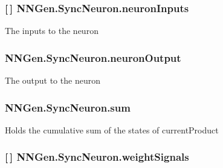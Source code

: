 \subsubsection[{neuron\+Inputs}]{ \mbox{[}$\,$\mbox{]} N\+N\+Gen.\+Sync\+Neuron.\+neuron\+Inputs\hspace{0.3cm}{\ttfamily [get]}}\label{class_n_n_gen_1_1_sync_neuron_a717f010aa22ec2a35ec0f314549a3177}


The inputs to the neuron 

\hypertarget{class_n_n_gen_1_1_sync_neuron_a0124d151cc6e1ff3dfbfe917e4d0ab2f}{}
\subsubsection[{neuron\+Output}]{ N\+N\+Gen.\+Sync\+Neuron.\+neuron\+Output\hspace{0.3cm}{\ttfamily [get]}}\label{class_n_n_gen_1_1_sync_neuron_a0124d151cc6e1ff3dfbfe917e4d0ab2f}


The output to the neuron 

\hypertarget{class_n_n_gen_1_1_sync_neuron_a025ec7f0da6e80d24e55f23e939afcec}{}
\subsubsection[{sum}]{ N\+N\+Gen.\+Sync\+Neuron.\+sum\hspace{0.3cm}{\ttfamily [get]}}\label{class_n_n_gen_1_1_sync_neuron_a025ec7f0da6e80d24e55f23e939afcec}


Holds the cumulative sum of the states of current\+Product 

\hypertarget{class_n_n_gen_1_1_sync_neuron_a1d9363beee9303179a0f47c0f143f97a}{}
\subsubsection[{weight\+Signals}]{ \mbox{[}$\,$\mbox{]} N\+N\+Gen.\+Sync\+Neuron.\+weight\+Signals\hspace{0.3cm}{\ttfamily [get]}}\label{class_n_n_gen_1_1_sync_neuron_a1d9363beee9303179a0f47c0f143f97a}


